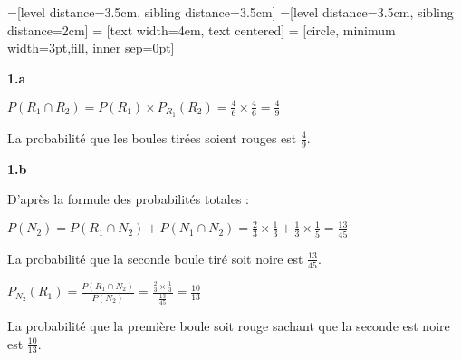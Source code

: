 \documentclass{article}
\newcommand{\vspacem}{\vspace{2mm}}
\newcommand{\bfrac}[2]{\displaystyle\frac{#1}{#2}}
\begin{document}
=[level distance=3.5cm, sibling distance=3.5cm]
=[level distance=3.5cm, sibling distance=2cm]
 = [text width=4em, text centered]
 = [circle, minimum width=3pt,fill, inner sep=0pt]

\textbf{1.a}
\vspacem

\noindent $P(R_1 \cap R_2) = P(R_1) \times P_{R_1}(R_2) = \bfrac{4}{6} \times \bfrac{4}{6} = \bfrac{4}{9}$

\noindent La probabilité que les boules tirées soient rouges est $\bfrac{4}{9}$.

\vspacem
\textbf{1.b}
\vspacem

\noindent D'après la formule des probabilités totales :

$P(N_2) = P(R_1 \cap N_2) + P(N_1 \cap N_2) = \bfrac{2}{3} \times \bfrac{1}{3} + \bfrac{1}{3} \times \bfrac{1}{5} = \bfrac{13}{45}$

\noindent La probabilité que la seconde boule tiré soit noire est $\bfrac{13}{45}$.

\noindent $P_{N_2}(R_1) = \bfrac{P(R_1 \cap N_2)}{P(N_2)} = \bfrac{\frac{2}{3} \times \frac{1}{3}}{\frac{13}{45}} = \bfrac{10}{13}$

\noindent La probabilité que la première boule soit rouge sachant que la seconde est noire est $\bfrac{10}{13}$.
\end{document}
